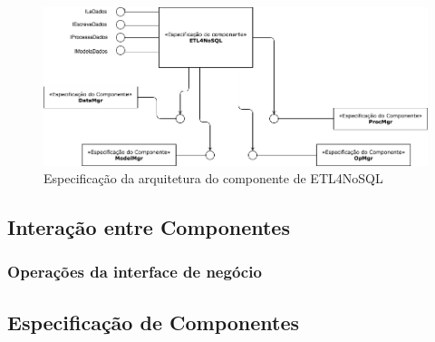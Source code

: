 \begin{figure}[h]
	\centering
	\includegraphics[scale=0.5]{fig/arquitetura_comp.png}
	\caption{Especificação da arquitetura do componente de ETL4NoSQL}
	\label{arquitetura}
\end{figure}

\subsection{Interação entre Componentes}

\subsubsection{Operações da interface de negócio}


\subsection{Especificação de Componentes}









